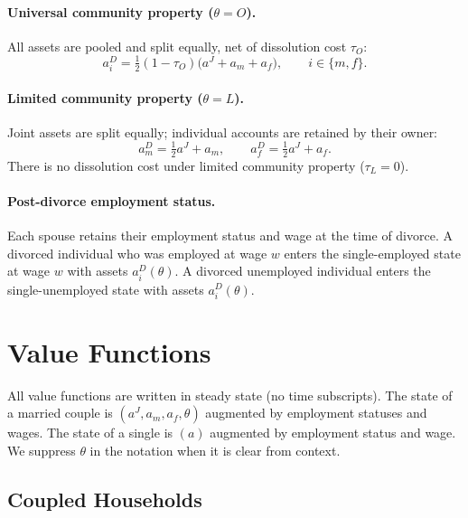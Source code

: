 \documentclass[11pt]{article}
\newcommand{\aJ}{a^{J}}
\begin{document}
\paragraph{Universal community property ($\theta = O$).}
All assets are pooled and split equally, net of dissolution cost $\tau_O$:
\begin{equation}
    a_i^D = \tfrac{1}{2}(1 - \tau_O)\bigl(\aJ + a_m + a_f\bigr), \qquad i \in \{m, f\}.
    \label{eq:divorce_O}
\end{equation}

\paragraph{Limited community property ($\theta = L$).}
Joint assets are split equally; individual accounts are retained by their owner:
\begin{equation}
    a_m^D = \tfrac{1}{2}\aJ + a_m, \qquad a_f^D = \tfrac{1}{2}\aJ + a_f.
    \label{eq:divorce_L}
\end{equation}
There is no dissolution cost under limited community property ($\tau_L = 0$).

\paragraph{Post-divorce employment status.} Each spouse retains their employment status and wage at the time of divorce. A divorced individual who was employed at wage $w$ enters the single-employed state at wage $w$ with assets $a_i^D(\theta)$. A divorced unemployed individual enters the single-unemployed state with assets $a_i^D(\theta)$.


\section{Value Functions}

All value functions are written in steady state (no time subscripts). The state of a married couple is $(\aJ, a_m, a_f, \theta)$ augmented by employment statuses and wages. The state of a single is $(a)$ augmented by employment status and wage. We suppress $\theta$ in the notation when it is clear from context.

\subsection{Coupled Households}
\end{document}
